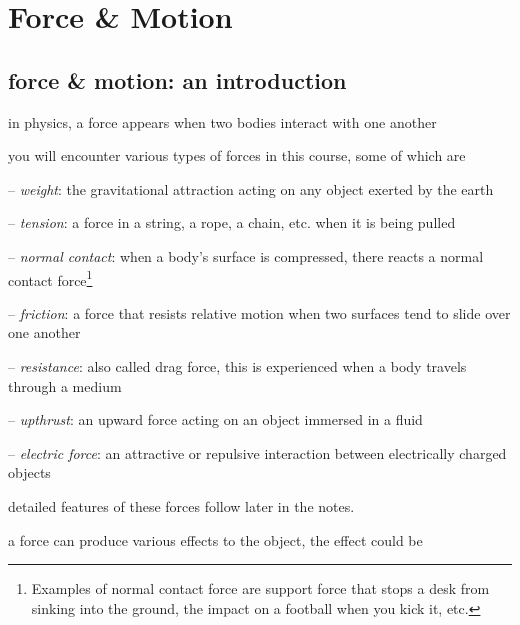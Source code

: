 \chapter{Force \& Motion}

\section{force \& motion: an introduction}

in physics, a force appears when two bodies interact with one another

\cmt you will encounter various types of forces in this course, some of which are

\begin{compactitem}
	\item[--] \emph{weight}: the gravitational attraction acting on any object exerted by the earth
	
	\item[--] \emph{tension}: a force in a string, a rope, a chain, etc. when it is being pulled
	
	\item[--] \emph{normal contact}: when a body's surface is compressed, there reacts a normal contact force\footnote{Examples of normal contact force are support force that stops a desk from sinking into the ground, the impact on a football when you kick it, etc.}
	
	\item[--] \emph{friction}: a force that resists relative motion when two surfaces tend to slide over one another
	
	\item[--] \emph{resistance}: also called drag force, this is experienced when a body travels through a medium

	
	\item[--] \emph{upthrust}: an upward force acting on an object immersed in a fluid
	
	\item[--] \emph{electric force}: an attractive or repulsive interaction between electrically charged objects
	
\end{compactitem}

detailed features of these forces follow later in the notes.

\cmt a force can produce various effects to the object, the effect could be

